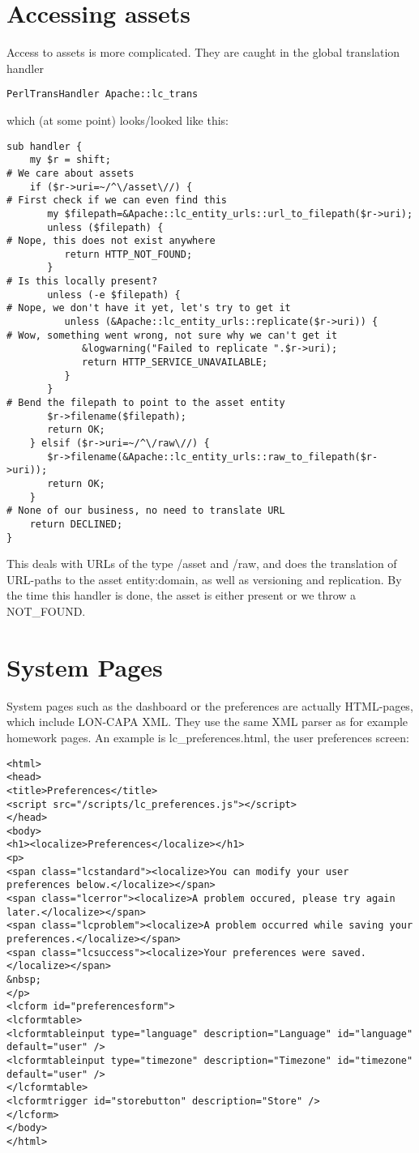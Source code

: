 \section{Accessing assets}\label{accassets}
Access to assets is more complicated. They are caught in the global translation handler
\begin{verbatim}
PerlTransHandler Apache::lc_trans
\end{verbatim}
which (at some point) looks/looked like this:
\begin{verbatim}
sub handler {
    my $r = shift;
# We care about assets
    if ($r->uri=~/^\/asset\//) {
# First check if we can even find this
       my $filepath=&Apache::lc_entity_urls::url_to_filepath($r->uri);
       unless ($filepath) {
# Nope, this does not exist anywhere
          return HTTP_NOT_FOUND;
       }
# Is this locally present?
       unless (-e $filepath) {
# Nope, we don't have it yet, let's try to get it
          unless (&Apache::lc_entity_urls::replicate($r->uri)) {
# Wow, something went wrong, not sure why we can't get it
             &logwarning("Failed to replicate ".$r->uri);
             return HTTP_SERVICE_UNAVAILABLE; 
          }
       }
# Bend the filepath to point to the asset entity
       $r->filename($filepath);
       return OK;
    } elsif ($r->uri=~/^\/raw\//) {
       $r->filename(&Apache::lc_entity_urls::raw_to_filepath($r->uri));
       return OK;
    } 
# None of our business, no need to translate URL
    return DECLINED; 
}
\end{verbatim}
This deals with URLs of the type /asset and /raw, and does the translation of URL-paths to the asset entity:domain, as well as versioning and replication. By the time this handler is done, the asset is either present or we throw a NOT\_FOUND.
\section{System Pages}
System pages such as the dashboard or the preferences are actually HTML-pages, which include LON-CAPA XML. They use the same XML parser as for example homework pages. An example is lc\_preferences.html, the user preferences screen:
\begin{verbatim}
<html>
<head>
<title>Preferences</title>
<script src="/scripts/lc_preferences.js"></script>
</head>
<body>
<h1><localize>Preferences</localize></h1>
<p>
<span class="lcstandard"><localize>You can modify your user preferences below.</localize></span>
<span class="lcerror"><localize>A problem occured, please try again later.</localize></span>
<span class="lcproblem"><localize>A problem occurred while saving your preferences.</localize></span>
<span class="lcsuccess"><localize>Your preferences were saved.</localize></span>
&nbsp;
</p>
<lcform id="preferencesform">
<lcformtable>
<lcformtableinput type="language" description="Language" id="language" default="user" />
<lcformtableinput type="timezone" description="Timezone" id="timezone" default="user" />
</lcformtable>
<lcformtrigger id="storebutton" description="Store" />
</lcform>
</body>
</html>
\end{verbatim}
